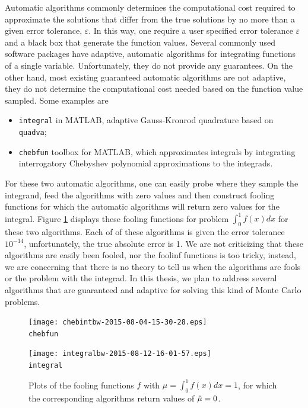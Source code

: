 \documentclass{iitthesis}
\begin{document}
Automatic algorithms commonly determines the computational cost required to approximate the solutions that differ from the true solutions by no more than a given error tolerance, $\varepsilon$. In this way, one require a user specified error tolerance $\varepsilon$ and a black box that generate the function values. Several commonly used software packages have adaptive, automatic algorithms for integrating functions of a single variable. Unfortunately, they do not provide any guarantees. On the other hand, most existing guaranteed automatic algorithms are not adaptive, they do not determine the computational cost needed based on the function value sampled. Some examples are
\begin{itemize}
\item {\tt integral} \cite{integralMatlab} in MATLAB, adaptive Gauss-Kronrod quadrature based on {\tt quadva};
\item {\tt chebfun} toolbox \cite{Chebfun14} for MATLAB, which approximates integrals by integrating interrogatory Chebyshev polynomial approximations to the integrads.
\end{itemize}
For these two automatic algorithms, one can easily probe where they sample the integrand, feed the algorithms with zero values and then construct fooling functions for which the automatic algorithms will return zero values for the integral. Figure \ref{fig:foolingfun} displays these fooling functions for problem $\int_0^1f(x)dx$ for these two algorithms. Each of of these algorithms is given the error tolerance $10^{-14}$, unfortunately, the true absolute error is 1. We are not criticizing that these algorithms are easily been fooled, nor the foolinf functions is too tricky, instead, we are concerning that there is no theory to tell us when the algorithms are fools or the problem with the integrad.
In this thesis, we plan to address several algorithms that are guaranteed and adaptive for solving this kind of Monte Carlo problems.
\begin{figure}[htbp]
\centering
\begin{minipage}{7cm}\centering 
\texttt{[image: chebintbw-2015-08-04-15-30-28.eps]} \\ {\tt chebfun}  \end{minipage}%
\begin{minipage}{7cm}\centering 
\texttt{[image: integralbw-2015-08-12-16-01-57.eps]} \\{\tt integral}
\end{minipage}
\caption{Plots of the fooling functions $f$ with $\mu = \int_0^1f(x)dx=1$, for which the corresponding algorithms return values of $\hat{\mu}=0$.}\label{fig:foolingfun}
 \end{figure}
 
\end{document}
